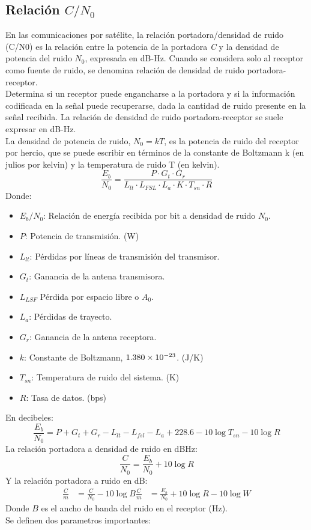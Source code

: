 \documentclass[
	12pt, %
	fleqn, %
	a4paper, %
	oneside, %
]{LegrandOrangeBook}
\begin{document}
\subsection{Relación $C/N_0$}
En las comunicaciones por satélite, la relación portadora/densidad de ruido (C/N0) es la relación entre la potencia de la portadora \textit{C} y la densidad de potencia del ruido $N_0$, expresada en dB-Hz. Cuando se considera solo al receptor como fuente de ruido, se denomina relación de densidad de ruido portadora-receptor.\\
Determina si un receptor puede engancharse a la portadora y si la información codificada en la señal puede recuperarse, dada la cantidad de ruido presente en la señal recibida. La relación de densidad de ruido portadora-receptor se suele expresar en dB-Hz.\\
La densidad de potencia de ruido, $N_0=kT$, es la potencia de ruido del receptor por hercio, que se puede escribir en términos de la constante de Boltzmann k (en julios por kelvin) y la temperatura de ruido T (en kelvin).
\begin{equation}
\frac{E_b}{N_0}=\frac{P\cdot G_t\cdot G_r}{L_{lt}\cdot L_{FSL}\cdot L_a\cdot K\cdot T_{sn}\cdot R}
\end{equation}
Donde:
\begin{itemize}
\item $E_b/N_0$: Relación de energía recibida por bit a densidad de ruido $N_0$.
\item $P$: Potencia de transmisión. (W)
\item $L_{lt}$: Pérdidas por líneas de transmisión del transmisor.
\item $G_t$: Ganancia de la antena transmisora.
\item $L_{LSF}$ Pérdida por espacio libre o $A_0$.
\item $L_a$: Pérdidas de trayecto.
\item $G_r$: Ganancia de la antena receptora.
\item $k$: Constante de Boltzmann, $1.380\times 10^{-23}$. (J/K)
\item $T_{sn}$: Temperatura de ruido del sistema. (K)
\item $R$: Tasa de datos. (bps)
\end{itemize}
En decibeles:
\begin{equation}
\frac{E_b}{N_0}=P+G_t+G_r-L_{lt}-L_{fsl}-L_a+228.6-10\log T_{sn}-10\log R
\end{equation}
La relación portadora a densidad de ruido en dBHz:
\begin{equation}
\frac{C}{N_0}=\frac{E_b}{N_0}+10\log R
\label{eq:ebno y tasa de datos}
\end{equation}
Y la relación portadora a ruido en dB:
\begin{align}
\frac{C}{m}&=\frac{C}{N_0}-10\log B
\frac{C}{m}&=\frac{E_b}{N_0}+10\log R-10\log W
\end{align}
Donde $B$ es el ancho de banda del ruido en el receptor (Hz).\\
Se definen dos parametros importantes:
\end{document}
